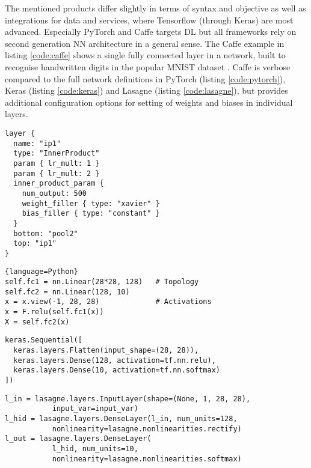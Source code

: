 \documentclass[report.tex]{subfiles}
\begin{document}
The mentioned products differ slightly in terms of syntax and objective 
as well as integrations for data and services, where Tensorflow (through Keras)
are most advanced.
Especially PyTorch and Caffe targets \gls{DL} but all frameworks
rely on second generation \gls{NN} architecture in a general sense.
The Caffe example in listing \ref{code:caffe} shows a single fully connected
layer in a network, built to recognise handwritten digits in the 
popular MNIST dataset \cite{LeCun1998}.
Caffe is verbose compared to the full network definitions in PyTorch 
(listing \ref{code:pytorch}), Keras (listing \ref{code:keras}) and
Lasagne (listing \ref{code:lasagne}), but provides additional 
configuration options for setting of weights and biases in 
individual layers.

\begin{lstlisting}
layer {
  name: "ip1"
  type: "InnerProduct"
  param { lr_mult: 1 }
  param { lr_mult: 2 }
  inner_product_param {
    num_output: 500
    weight_filler { type: "xavier" }
    bias_filler { type: "constant" }
  }
  bottom: "pool2"
  top: "ip1"
}
\end{lstlisting} \label{code:caffe}

\begin{lstlisting}{language=Python}
self.fc1 = nn.Linear(28*28, 128)   # Topology
self.fc2 = nn.Linear(128, 10)
x = x.view(-1, 28, 28)             # Activations
x = F.relu(self.fc1(x))
X = self.fc2(x)
\end{lstlisting} \label{code:pytorch}

\begin{lstlisting}
keras.Sequential([
  keras.layers.Flatten(input_shape=(28, 28)),
  keras.layers.Dense(128, activation=tf.nn.relu),
  keras.layers.Dense(10, activation=tf.nn.softmax)
])
\end{lstlisting} \label{code:keras}

\begin{lstlisting}
l_in = lasagne.layers.InputLayer(shape=(None, 1, 28, 28),
           input_var=input_var)
l_hid = lasagne.layers.DenseLayer(l_in, num_units=128,
           nonlinearity=lasagne.nonlinearities.rectify)
l_out = lasagne.layers.DenseLayer(
           l_hid, num_units=10,
           nonlinearity=lasagne.nonlinearities.softmax)
\end{lstlisting} \label{code:lasagne}
\end{document}
